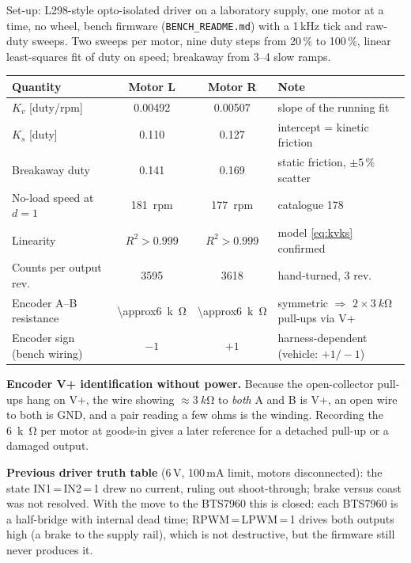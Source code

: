 \documentclass[11pt,a4paper]{article}
\newcommand{\code}[1]{\texttt{\small #1}}
\begin{document}
Set-up: L298-style opto-isolated driver on a laboratory supply, one motor at a
time, no wheel, bench firmware (\code{BENCH\_README.md}) with a 1\,kHz tick and
raw-duty sweeps. Two sweeps per motor, nine duty steps from 20\,\% to 100\,\%,
linear least-squares fit of duty on speed; breakaway from 3--4 slow ramps.

\begin{center}
\small
\begin{tabular}{@{}lccl@{}}
\toprule
\textbf{Quantity} & \textbf{Motor L} & \textbf{Motor R} & \textbf{Note}\\
\midrule
$K_v$ [duty/rpm] & 0.00492 & 0.00507 & slope of the running fit\\
$K_s$ [duty] & 0.110 & 0.127 & intercept = kinetic friction\\
Breakaway duty & 0.141 & 0.169 & static friction, $\pm5\,\%$ scatter\\
No-load speed at $d=1$ & \qty{181}{rpm} & \qty{177}{rpm} & catalogue 178\\
Linearity & $R^2>0.999$ & $R^2>0.999$ & model \cref{eq:kvks} confirmed\\
Counts per output rev. & 3595 & 3618 & hand-turned, 3 rev.\\
Encoder A--B resistance & \qty{\approx6}{k\ohm} & \qty{\approx6}{k\ohm} & symmetric $\Rightarrow$ $2\times\qty{3}{k\ohm}$ pull-ups via V+\\
Encoder sign (bench wiring) & $-1$ & $+1$ & harness-dependent (vehicle: $+1/-1$)\\
\bottomrule
\end{tabular}
\end{center}

\textbf{Encoder V+ identification without power.} Because the open-collector
pull-ups hang on V+, the wire showing $\approx\qty{3}{k\ohm}$ to \emph{both} A and
B is V+, an open wire to both is GND, and a pair reading a few ohms is the
winding. Recording the \qty{6}{k\ohm} per motor at goods-in gives a later
reference for a detached pull-up or a damaged output.

\textbf{Previous driver truth table} (6\,V, 100\,mA limit, motors
disconnected): the state IN1\,=\,IN2\,=\,1 drew no current, ruling out
shoot-through; brake versus coast was not resolved. With the move to the
BTS7960 this is closed: each BTS7960 is a half-bridge with internal dead time;
RPWM\,=\,LPWM\,=\,1 drives both outputs high (a brake to the supply rail), which
is not destructive, but the firmware still never produces it.
\end{document}
